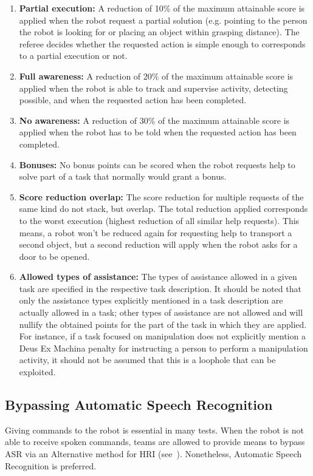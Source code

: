 \begin{enumerate}
	\item \textbf{Partial execution:} A reduction of 10\% of the maximum attainable score is applied when the robot request a partial solution (e.g. pointing to the person the robot is looking for or placing an object within grasping distance).
	The referee decides whether the requested action is simple enough to corresponds to a partial execution or not.

	\item \textbf{Full awareness:} A reduction of 20\% of the maximum attainable score is applied when the robot is able to track and supervise activity, detecting possible, and when the requested action has been completed.

	\item \textbf{No awareness:} A reduction of 30\% of the maximum attainable score is applied when the robot has to be told when the requested action has been completed.

	\item \textbf{Bonuses:} No bonus points can be scored when the robot requests help to solve part of a task that normally would grant a bonus.

	\item \textbf{Score reduction overlap:} The score reduction for multiple requests of the same kind do not stack, but overlap.
	The total reduction applied corresponds to the worst execution (highest reduction of all similar help requests).
	This means, a robot won't be reduced again for requesting help to transport a second object, but a second reduction will apply when the robot asks for a door to be opened.

	\item \textbf{Allowed types of assistance:} The types of assistance allowed in a given task are specified in the respective task description.
	It should be noted that only the assistance types explicitly mentioned in a task description are actually allowed in a task; other types of assistance are not allowed and will nullify the obtained points for the part of the task in which they are applied.
	For instance, if a task focused on manipulation does not explicitly mention a Deus Ex Machina penalty for instructing a person to perform a manipulation activity, it should not be assumed that this is a loophole that can be exploited.
\end{enumerate}

\subsection{Bypassing Automatic Speech Recognition}\label{rule:asrcontinue}
Giving commands to the robot is essential in many tests.
When the robot is not able to receive spoken commands, teams are allowed to provide means to bypass ASR via an Alternative method for HRI (see~).
Nonetheless, Automatic Speech Recognition is preferred.

